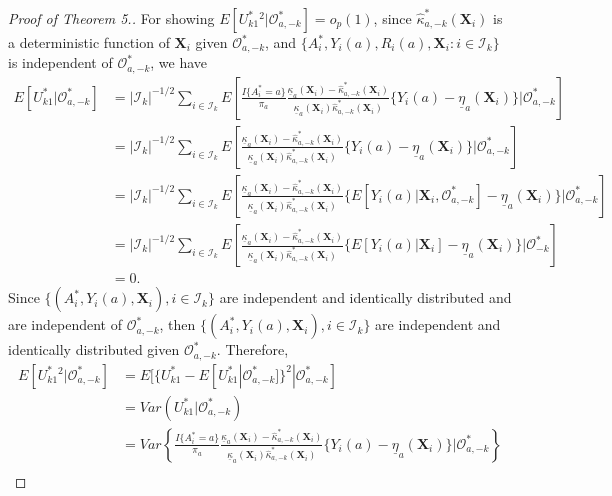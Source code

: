 \documentclass[12pt]{article}
\newcommand{\bX}{\boldsymbol{X}}
\begin{document}
\begin{proof}[Proof of Theorem 5.]
For showing $E[U_{k1}^*{}^2|\mathcal{O}^*_{a,-k}] = o_p(1)$, since $\widehat{\kappa}_{a,-k}^*(\bX_i)$ is a deterministic function of $\bX_i$ given $\mathcal{O}_{a,-k}^*$, and $\{A_i^*,Y_i(a), R_i(a), \bX_i: i \in \mathcal{I}_k\}$ is independent of $\mathcal{O}_{a,-k}^*$, we have
\begin{align*}
    E[U_{k1}^*|\mathcal{O}_{a,-k}^*] &= |\mathcal{I}_k|^{-1/2} \sum_{i \in \mathcal{I}_k} E\left[\frac{I\{A_i^*=a\}}{\pi_a} \frac{\underline{\kappa}_a(\bX_i) - \widehat{\kappa}_{a,-k}^*(\bX_i)}{\underline{\kappa}_a(\bX_i)\widehat{\kappa}_{a,-k}^*(\bX_i)}\{Y_i(a) - \underline{\eta}_a(\bX_i)\}\bigg|\mathcal{O}_{a,-k}^*\right] \\
    &= |\mathcal{I}_k|^{-1/2} \sum_{i \in \mathcal{I}_k} E\left[\frac{\underline{\kappa}_a(\bX_i) - \widehat{\kappa}_{a,-k}^*(\bX_i)}{\underline{\kappa}_a(\bX_i)\widehat{\kappa}_{a,-k}^*(\bX_i)}\{Y_i(a) - \underline{\eta}_a(\bX_i)\}\bigg|\mathcal{O}_{a,-k}^*\right] \\
    &= |\mathcal{I}_k|^{-1/2} \sum_{i \in \mathcal{I}_k} E\left[\frac{\underline{\kappa}_a(\bX_i) - \widehat{\kappa}_{a,-k}^*(\bX_i)}{\underline{\kappa}_a(\bX_i)\widehat{\kappa}_{a,-k}^*(\bX_i)}\{E[Y_i(a)|\bX_i,\mathcal{\mathcal{O}}_{a,-k}^*] - \underline{\eta}_a(\bX_i)\}\bigg|\mathcal{O}_{a,-k}^*\right] \\
    &= |\mathcal{I}_k|^{-1/2} \sum_{i \in \mathcal{I}_k} E\left[\frac{\underline{\kappa}_a(\bX_i) - \widehat{\kappa}_{a,-k}^*(\bX_i)}{\underline{\kappa}_a(\bX_i)\widehat{\kappa}_{a,-k}^*(\bX_i)}\{E[Y_i(a)|\bX_i] - \underline{\eta}_a(\bX_i)\}\bigg|\mathcal{O}_{-k}^*\right] \\    
    &= 0.
\end{align*}
Since $\{(A_i^*, Y_i(a), \bX_i), i \in \mathcal{I}_k\}$ are independent and identically distributed and are independent of $\mathcal{O}^*_{a,-k}$,  then $\{(A_i^*, Y_i(a), \bX_i), i \in \mathcal{I}_k\}$ are independent and identically distributed given  $\mathcal{O}^*_{a,-k}$.
Therefore, 
\begin{align*}
    E[U_{k1}^*{}^2|\mathcal{O}^*_{a, -k}] &= E[\{U_{k1}^* - E[U_{k1}^*|\mathcal{O}_{a,-k}^*]\}^2|\mathcal{O}^*_{a,-k}] \\
    &= Var(U_{k1}^*|\mathcal{O}^*_{a,-k}) \\
    &= Var\left\{\frac{I\{A_i^*=a\}}{\pi_a} \frac{\underline{\kappa}_a(\bX_i) - \widehat{\kappa}_{a,-k}^*(\bX_i)}{\underline{\kappa}_a(\bX_i)\widehat{\kappa}_{a,-k}^*(\bX_i)}\{Y_i(a) - \underline{\eta}_a(\bX_i)\}\bigg|\mathcal{O}^*_{a,-k}\right\} \\

\end{align*}
\end{proof}
\end{document}
